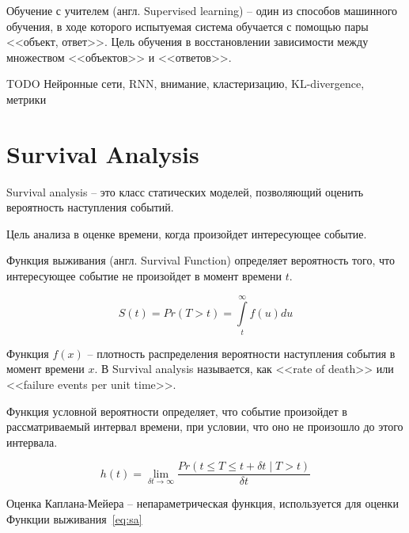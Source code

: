 \documentclass[times,specification,annotation]{itmo-student-thesis}
\begin{document}
\begin{definition}
    Обучение с учителем (англ. Supervised learning) – один из способов машинного обучения, 
    в ходе которого испытуемая система обучается с помощью пары <<объект, ответ>>.
    Цель обучения в восстановлении зависимости между множеством <<объектов>> и <<ответов>>.
\end{definition}

TODO Нейронные сети, RNN, внимание, кластеризацию, KL-divergence, метрики

\section{Survival Analysis}

\begin{definition}
    Survival analysis – это класс статических моделей, позволяющий оценить вероятность наступления событий.
\end{definition}

Цель анализа в оценке времени, когда произойдет интересующее событие.

\begin{definition}
    Функция выживания (англ. Survival Function) определяет вероятность того, что интересующее событие не произойдет в момент времени \(t\).
\end{definition}

\begin{equation}\label{eq:sa}
    S(t) = Pr(T > t) = \int\limits_{t}^{\infty} f(u) du
\end{equation}

Функция $f(x)$ – плотность распределения вероятности наступления события в момент времени $x$.
В Survival analysis называется, как <<rate of death>> или <<failure events per unit time>>.

Функция условной вероятности определяет, что событие произойдет в рассматриваемый интервал времени, 
при условии, что оно не произошло до этого интервала.

\begin{equation}
    h(t) = \lim_{\delta t\to\infty} \frac{Pr(t \leq T \leq t + \delta t \mid T > t)}{\delta t}
\end{equation}

\begin{definition}
    Оценка Каплана-Мейера – непараметрическая функция, используется для оценки Функции выживания~\ref{eq:sa}
\end{definition}
\end{document}
